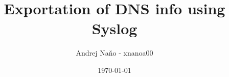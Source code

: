 \documentclass{report}
\title{Exportation of DNS info using Syslog}
\author{Andrej Naňo - xnanoa00}
\date{\today}
\begin{document}
\newpage
\maketitle
\newpage


\renewcommand{\contentsname}{Table of Content}
\tableofcontents







\end{document}
